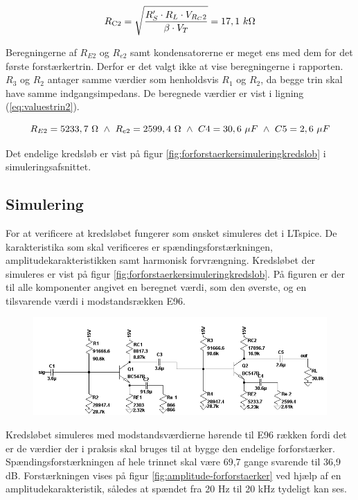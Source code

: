 \begin{equation}
R_{\mathrm{C2}} = \sqrt{\frac{R'_S \cdot R_L \cdot V_{R_C2}}{\beta \cdot V_T}} = 17,1~k\ohm
\label{eq:rc2maks}
\end{equation}

Beregningerne af $R_{E2}$ og $R_{e2}$ samt kondensatorerne er meget ens med dem for det første forstærkertrin. Derfor er det valgt ikke at vise beregningerne i rapporten. $R_3$ og $R_2$ antager samme værdier som henholdsvis $R_1$ og $R_2$, da begge trin skal have samme indgangsimpedans. De beregnede værdier er vist i ligning (\ref{eq:valuestrin2}).

\begin{equation}
R_{E2}=5233,7~\ohm ~ \wedge ~R_{e2}=2599,4~\ohm ~ \wedge ~ C4=30,6~\mu F ~ \wedge ~ C5=2,6~\mu F
\label{eq:valuestrin2}
\end{equation}

Det endelige kredsløb er vist på figur \ref{fig:forforstaerkersimuleringkredslob} i simuleringsafsnittet.

\subsection*{Simulering}

For at verificere at kredsløbet fungerer som ønsket simuleres det i LTspice. De karakteristika som skal verificeres er spændingsforstærkningen, amplitudekarakteristikken samt harmonisk forvrængning. Kredsløbet der simuleres er vist på figur \ref{fig:forforstaerkersimuleringkredslob}. På figuren er der til alle komponenter angivet en beregnet værdi, som den øverste, og en tilsvarende værdi i modstandsrækken E96. 

\begin{figure}[h]
\centering
\includegraphics[scale=.6]{teknisk/forforstaerker/forforstaerkerendeligkreds.png}
\caption{}
\label{}
\end{figure}

Kredsløbet simuleres med modstandsværdierne hørende til E96 rækken fordi det er de værdier der i praksis skal bruges til at bygge den endelige forforstærker. 
Spændingsforstærkningen af hele trinnet skal være 69,7 gange svarende til 36,9 dB. Forstærkningen vises på figur \ref{fig:amplitude-forforstaerker} ved hjælp af en amplitudekarakteristik, således at spændet fra 20 Hz til 20 kHz tydeligt kan ses. 


